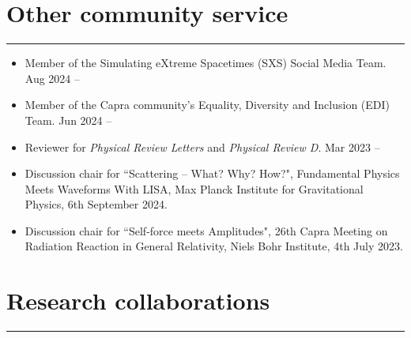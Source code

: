 \documentclass[10.5pt, oneside]{article}   	%
\begin{document}
 {\color{Sectioncolour}
\section*{Other community service}
\vspace{-3mm}
\noindent\rule{\linewidth}{0.6pt}}
\begin{itemize}
\item Member of the Simulating eXtreme Spacetimes (SXS) Social Media Team.  \hfill Aug 2024 --\\ \vspace{-5mm}
\item Member of the Capra community's Equality, Diversity and Inclusion (EDI) Team.  \hfill Jun 2024 --\\ \vspace{-5mm}
\item Reviewer for {\em Physical Review Letters} and {\em Physical Review D}.  \hfill Mar 2023 --\\ \vspace{-5mm}
\item Discussion chair for ``Scattering -- What? Why? How?", Fundamental Physics Meets Waveforms With LISA, Max Planck Institute for Gravitational Physics, 6th September 2024.
\item Discussion chair for ``Self-force meets Amplitudes", 26th Capra Meeting on Radiation Reaction in General Relativity, Niels Bohr Institute, 4th July 2023.
\end{itemize} 

{\color{Sectioncolour}
\section*{Research collaborations}
\vspace{-3mm}
\noindent\rule{\linewidth}{0.6pt}}
\end{document}
